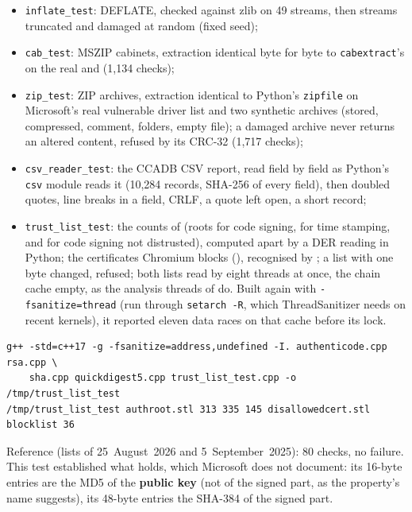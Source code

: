 \documentclass[11pt,a4paper,oneside]{report}
\begin{document}
\begin{itemize}
  \item \texttt{inflate\_test}: DEFLATE, checked against zlib on 49 streams,
    then streams truncated and damaged at random (fixed seed);
  \item \texttt{cab\_test}: MSZIP cabinets, extraction identical byte for byte
    to \texttt{cabextract}'s on the real  and
     (1,134 checks);
  \item \texttt{zip\_test}: ZIP archives, extraction identical to Python's
    \texttt{zipfile} on Microsoft's real vulnerable driver list and two
    synthetic archives (stored, compressed, comment, folders, empty file); a
    damaged archive never returns an altered content, refused by its CRC-32
    (1,717 checks);
  \item \texttt{csv\_reader\_test}: the CCADB CSV report, read field by
    field as Python's \texttt{csv} module reads it (10,284 records, SHA-256
    of every field), then doubled quotes, line breaks in a field, CRLF, a
    quote left open, a short record;
  \item \texttt{trust\_list\_test}: the counts of  (roots
    for code signing, for time stamping, and for code signing not distrusted),
    computed apart by a DER reading in Python; the certificates Chromium blocks
    (), recognised by
    ; a list with one byte changed, refused; both
    lists read by eight threads at once, the chain cache empty, as the
    analysis threads of   do. Built again with
    \texttt{-fsanitize=thread} (run through \texttt{setarch -R}, which
    ThreadSanitizer needs on recent kernels), it reported eleven data races on
    that cache before its lock.
\end{itemize}

\begin{lstlisting}
g++ -std=c++17 -g -fsanitize=address,undefined -I. authenticode.cpp rsa.cpp \
    sha.cpp quickdigest5.cpp trust_list_test.cpp -o /tmp/trust_list_test
/tmp/trust_list_test authroot.stl 313 335 145 disallowedcert.stl blocklist 36
\end{lstlisting}

Reference (lists of 25~August~2026 and 5~September~2025): 80 checks, no
failure. This test established what \fichier{disallowedcert.stl} holds, which
Microsoft does not document: its 16-byte entries are the MD5 of the
\textbf{public key} (not of the signed part, as the property's name suggests),
its 48-byte entries the SHA-384 of the signed part.
\end{document}
